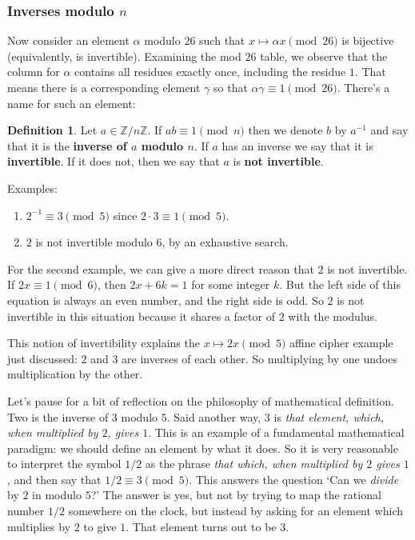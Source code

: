 \documentclass{article}
\theoremstyle{plain}
\theoremstyle{definition}
\newtheorem{definition}[theorem]{Definition}
\theoremstyle{remark}
\numberwithin{theorem}{section}
\newcommand{\ZZ}{\mathbb{Z}}
\begin{document}
\subsubsection{Inverses modulo $n$}

Now consider an element $\alpha$ modulo $26$ such that $x \mapsto \alpha x\pmod{26}$ is bijective (equivalently, is invertible).  Examining the mod $26$ table, we observe that the column for $\alpha$ contains all residues exactly once, including the residue $1$.  That means there is a corresponding element $\gamma$ so that $\alpha \gamma \equiv 1 \pmod{26}$.  There's a name for such an element:

\begin{definition}
	Let $a \in \ZZ/n\ZZ$.  If $ab \equiv 1 \pmod n$ then we denote $b$ by $a^{-1}$ and say that it is the \textbf{inverse of $a$ modulo $n$}.  If $a$ has an inverse we say that it is \textbf{invertible}.  If it does not, then we say that $a$ is \textbf{not invertible}.
\end{definition}

Examples:
\begin{enumerate}
	\item $2^{-1} \equiv 3 \pmod 5$ since $2 \cdot 3 \equiv 1 \pmod 5$.
	\item $2$ is not invertible modulo $6$, by an exhaustive search.
\end{enumerate}

For the second example, we can give a more direct reason that $2$ is not invertible.  If $2x \equiv 1 \pmod 6$, then $2x + 6k = 1$ for some integer $k$.  But the left side of this equation is always an even number, and the right side is odd.  So $2$ is not invertible in this situation because it shares a factor of $2$ with the modulus.

This notion of invertibility explains the $x \mapsto 2x \pmod 5$ affine cipher example just discussed:  $2$ and $3$ are inverses of each other.  So multiplying by one undoes multiplication by the other.

Let's pause for a bit of reflection on the philosophy of mathematical definition.  Two is the inverse of $3$ modulo $5$.  Said another way, $3$ is \emph{that element, which, when multiplied by $2$, gives $1$}.  This is an example of a fundamental mathematical paradigm:  we should define an element by what it does.  So it is very reasonable to interpret the symbol $1/2$ as the phrase \emph{that which, when multiplied by $2$ gives $1$}, and then say that $1/2 \equiv 3 \pmod 5$.  This answers the question `Can we \emph{divide} by $2$ in modulo $5$?'  The answer is yes, but not by trying to map the rational number $1/2$ somewhere on the clock, but instead by asking for an element which multiplies by $2$ to give $1$.  That element turns out to be $3$.
\end{document}
